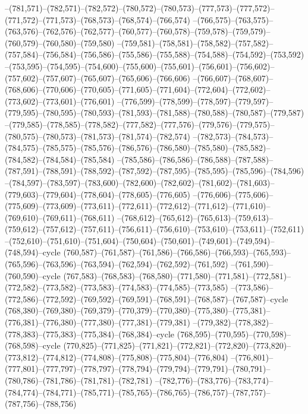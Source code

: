 --(781,571)--(782,571)--(782,572)--(780,572)--(780,573)--(777,573)--(777,572)--(771,572)--(771,573)--(768,573)--(768,574)--(766,574)
--(766,575)--(763,575)--(763,576)--(762,576)--(762,577)--(760,577)--(760,578)--(759,578)--(759,579)--(760,579)--(760,580)--(759,580)
--(759,581)--(758,581)--(758,582)--(757,582)--(757,584)--(756,584)--(756,586)--(755,586)--(755,588)--(754,588)--(754,592)--(753,592)
--(753,595)--(754,595)--(754,600)--(755,600)--(755,601)--(756,601)--(756,602)--(757,602)--(757,607)--(765,607)--(765,606)--(766,606)
--(766,607)--(768,607)--(768,606)--(770,606)--(770,605)--(771,605)--(771,604)--(772,604)--(772,602)--(773,602)--(773,601)--(776,601)
--(776,599)--(778,599)--(778,597)--(779,597)--(779,595)--(780,595)--(780,593)--(781,593)--(781,588)--(780,588)--(780,587)--(779,587)
--(779,585)--(778,585)--(778,582)--(777,582)--(777,576)--(779,576)--(779,575)--(780,575)--(780,573)--(781,573)--(781,574)--(782,574)
--(782,573)--(784,573)--(784,575)--(785,575)--(785,576)--(786,576)--(786,580)--(785,580)--(785,582)--(784,582)--(784,584)--(785,584)
--(785,586)--(786,586)--(786,588)--(787,588)--(787,591)--(788,591)--(788,592)--(787,592)--(787,595)--(785,595)--(785,596)--(784,596)
--(784,597)--(783,597)--(783,600)--(782,600)--(782,602)--(781,602)--(781,603)--(779,603)--(779,604)--(778,604)--(778,605)--(776,605)
--(776,606)--(775,606)--(775,609)--(773,609)--(773,611)--(772,611)--(772,612)--(771,612)--(771,610)--(769,610)--(769,611)--(768,611)
--(768,612)--(765,612)--(765,613)--(759,613)--(759,612)--(757,612)--(757,611)--(756,611)--(756,610)--(753,610)--(753,611)--(752,611)
--(752,610)--(751,610)--(751,604)--(750,604)--(750,601)--(749,601)--(749,594)--(748,594)--cycle
(760,587)--(761,587)--(761,586)--(766,586)--(766,593)--(765,593)--(765,596)--(763,596)--(763,594)--(762,594)--(762,592)--(761,592)
--(761,590)--(760,590)--cycle
(767,583)--(768,583)--(768,580)--(771,580)--(771,581)--(772,581)--(772,582)--(773,582)--(773,583)--(774,583)--(774,585)--(773,585)
--(773,586)--(772,586)--(772,592)--(769,592)--(769,591)--(768,591)--(768,587)--(767,587)--cycle
(768,380)--(769,380)--(769,379)--(770,379)--(770,380)--(775,380)--(775,381)--(776,381)--(776,380)--(777,380)--(777,381)--(779,381)
--(779,382)--(778,382)--(778,383)--(775,383)--(775,384)--(768,384)--cycle
(768,595)--(770,595)--(770,598)--(768,598)--cycle
(770,825)--(771,825)--(771,821)--(772,821)--(772,820)--(773,820)--(773,812)--(774,812)--(774,808)--(775,808)--(775,804)--(776,804)
--(776,801)--(777,801)--(777,797)--(778,797)--(778,794)--(779,794)--(779,791)--(780,791)--(780,786)--(781,786)--(781,781)--(782,781)
--(782,776)--(783,776)--(783,774)--(784,774)--(784,771)--(785,771)--(785,765)--(786,765)--(786,757)--(787,757)--(787,756)--(788,756)
